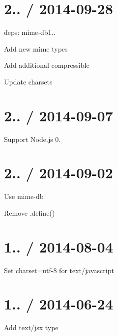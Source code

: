 \section*{2.. / 2014-\/09-\/28 }


\begin{DoxyItemize}
\item deps\+: mime-\/db1..
\begin{DoxyItemize}
\item Add new mime types
\item Add additional compressible
\item Update charsets
\end{DoxyItemize}
\end{DoxyItemize}

\section*{2.. / 2014-\/09-\/07 }


\begin{DoxyItemize}
\item Support Node.\+js 0.
\end{DoxyItemize}

\section*{2.. / 2014-\/09-\/02 }


\begin{DoxyItemize}
\item Use {\ttfamily mime-\/db}
\item Remove {\ttfamily .define()}
\end{DoxyItemize}

\section*{1.. / 2014-\/08-\/04 }


\begin{DoxyItemize}
\item Set charset=utf-\/8 for {\ttfamily text/javascript}
\end{DoxyItemize}

\section*{1.. / 2014-\/06-\/24 }


\begin{DoxyItemize}
\item Add {\ttfamily text/jsx} type
\end{DoxyItemize}

